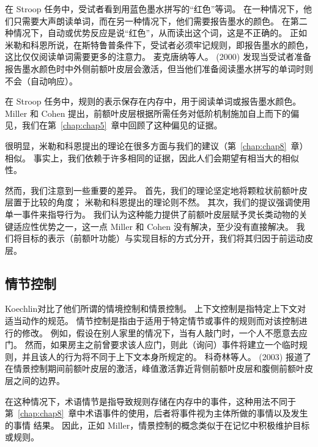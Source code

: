 在 Stroop 任务中，受试者看到用蓝色墨水拼写的“红色”等词。
在一种情况下，他们只需要大声朗读单词，而在另一种情况下，他们需要报告墨水的颜色。
在第二种情况下，自动或优势反应是说“红色”，从而读出这个词，这是不正确的。
正如米勒和科恩所说，在斯特鲁普条件下，受试者必须牢记规则，即报告墨水的颜色，这比仅仅阅读单词需要更多的注意力。
麦克唐纳等人。 (2000) 发现当受试者准备报告墨水颜色时中外侧前额叶皮层会激活，但当他们准备阅读墨水拼写的单词时则不会（自动响应）。
\par


在 Stroop 任务中，规则的表示保存在内存中，用于阅读单词或报告墨水颜色。
Miller 和 Cohen 提出，前额叶皮层根据所需任务对低阶机制施加自上而下的偏见，我们在第~\ref{chap:chap5}~章中回顾了这种偏见的证据。
\par


很明显，米勒和科恩\cite{miller2001integrative}提出的理论在很多方面与我们的建议（第~\ref{chap:chap8}~章）相似。
事实上，我们依赖于许多相同的证据，因此人们会期望有相当大的相似性。
\par


然而，我们注意到一些重要的差异。
首先，我们的理论坚定地将颗粒状前额叶皮层置于比较的角度；
米勒和科恩提出的理论则不然。
其次，我们的提议强调使用单一事件来指导行为。
我们认为这种能力提供了前额叶皮层赋予灵长类动物的关键适应性优势之一，这一点 Miller 和 Cohen 没有解决，至少没有直接解决。
我们将目标的表示（前额叶功能）与实现目标的方式分开，我们将其归因于前运动皮层。



\subsection{情节控制}

Koechlin\cite{koechlin2007information}对比了他们所谓的情境控制和情景控制。
上下文控制是指特定上下文对适当动作的规范。
情节控制是指由于适用于特定情节或事件的规则而对该控制进行的修改。
例如，假设在别人家里的情况下，当有人敲门时，一个人不愿意去应门。
然而，如果房主之前曾要求该人应门，则此（询问）事件将建立一个临时规则，并且该人的行为将不同于上下文本身所规定的。
科奇林等人。 (2003) 报道了在情景控制期间前额叶皮层的激活，峰值激活靠近背侧前额叶皮层和腹侧前额叶皮层之间的边界。
\par


在这种情况下，术语情节是指导致规则存储在内存中的事件，这种用法不同于第~\ref{chap:chap8}~章中术语事件的使用，后者将事件视为主体所做的事情以及发生的事情 结果。
因此，正如 Miller\cite{miller2001integrative}，情景控制的概念类似于在记忆中积极维护目标或规则。
\par


